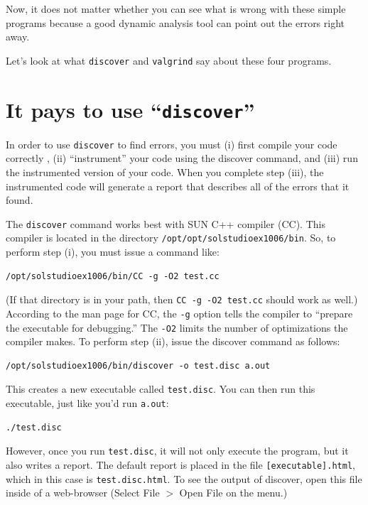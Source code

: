 \documentclass[12pt]{article}
\begin{document}
Now, it does not matter whether you can see what is wrong with these 
simple programs because a good dynamic analysis tool can point out 
the errors right away. 

Let's look at what \verb+discover+ and \verb+valgrind+ say about these four programs.

\section{It pays to use ``{\tt discover}''}
In order to use \verb+discover+ to find errors, you must 
(i) first compile your code correctly , (ii) ``instrument'' your code using 
the discover command, and (iii) run the instrumented version of your code.
When you complete step (iii), the instrumented code will generate a report that
describes all of the errors that it found.

The \verb+discover+ command works best with SUN C++ compiler (CC).  This compiler
is located in the directory \verb+/opt/opt/solstudioex1006/bin+.  So, to
perform step (i), you must issue a command like:
\begin{verbatim}
/opt/solstudioex1006/bin/CC -g -O2 test.cc
\end{verbatim}
(If that directory is in your path, then \verb+CC -g -O2 test.cc+ should work as well.)
According to the man page for CC, the \verb+-g+ option tells the compiler to ``prepare the executable for debugging.''  The \verb+-O2+ limits the number
of optimizations the compiler makes.  To perform step (ii), issue the
discover command as follows:
\begin{verbatim}
/opt/solstudioex1006/bin/discover -o test.disc a.out
\end{verbatim}
This creates a new executable called \verb+test.disc+.  You can then run this
executable, just like you'd run \verb+a.out+:
\begin{verbatim}
./test.disc
\end{verbatim}
However, once you run \verb+test.disc+, it will not only execute the program, but
it also writes a report.  The default report is placed in the file
\verb+[executable].html+, which in this case is \verb+test.disc.html+.
To see the output of discover, open this file inside of a web-browser (Select File $>$ Open File on the menu.)   
\vspace*{0.2 in}

\noindent {}
\vspace*{0.2 in}
\end{document}

